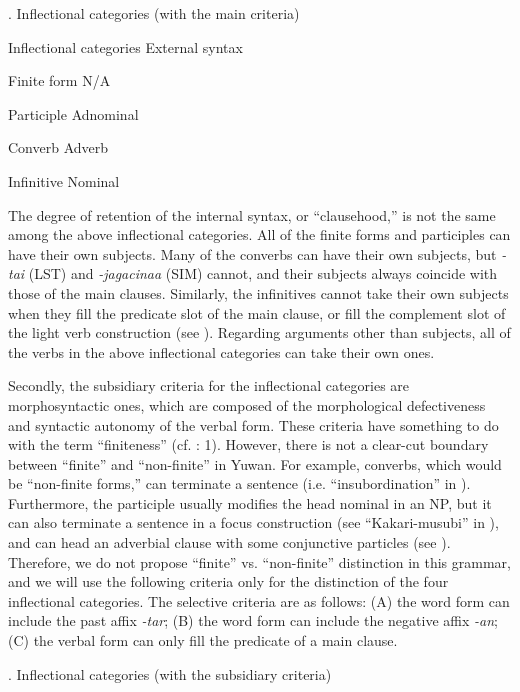 \begin{styleBeschriftung}
\textmd{}\textmd{. Inflectional categories (with the main criteria)}
\end{styleBeschriftung}

Inflectional categories  External syntax

Finite form  N/A

Participle  Adnominal

Converb  Adverb

Infinitive  Nominal

The degree of retention of the internal syntax, or “clausehood,” is not the same among the above inflectional categories. All of the finite forms and participles can have their own subjects. Many of the converbs can have their own subjects, but \textit{{}-tai} (LST) and \textit{{}-jagacinaa} (SIM) cannot, and their subjects always coincide with those of the main clauses. Similarly, the infinitives cannot take their own subjects when they fill the predicate slot of the main clause, or fill the complement slot of the light verb construction (see ). Regarding arguments other than subjects, all of the verbs in the above inflectional categories can take their own ones.

  Secondly, the subsidiary criteria for the inflectional categories are morphosyntactic ones, which are composed of the morphological defectiveness and syntactic autonomy of the verbal form. These criteria have something to do with the term “finiteness” (cf. \citealt{Nikolaeva2007}: 1). However, there is not a clear-cut boundary between “finite” and “non-finite” in Yuwan. For example, converbs, which would be “non-finite forms,” can terminate a sentence (i.e. “insubordination” in ). Furthermore, the participle usually modifies the head nominal in an NP, but it can also terminate a sentence in a focus construction (see “Kakari-musubi” in ), and can head an adverbial clause with some conjunctive particles (see ). Therefore, we do not propose “finite” vs. “non-finite” distinction in this grammar, and we will use the following criteria only for the distinction of the four inflectional categories. The selective criteria are as follows: (A) the word form can include the past affix \textit{{}-tar}; (B) the word form can include the negative affix \textit{{}-an}; (C) the verbal form can only fill the predicate of a main clause.

\begin{styleBeschriftung}
\textmd{}\textmd{. Inflectional categories (with the subsidiary criteria)}
\end{styleBeschriftung}

